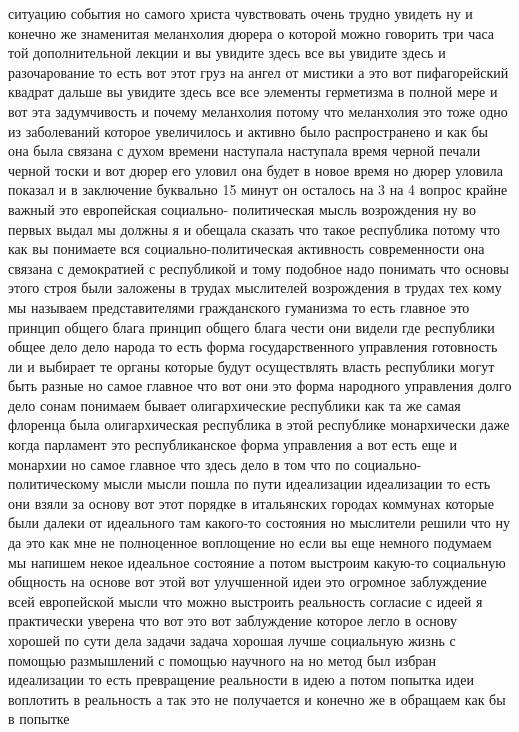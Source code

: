 ситуацию события но самого христа чувствовать очень трудно увидеть ну и конечно
же знаменитая меланхолия дюрера о которой можно говорить три часа той
дополнительной лекции и вы увидите здесь все вы увидите здесь и разочарование то
есть вот этот груз на ангел от мистики а это вот пифагорейский квадрат дальше вы
увидите здесь все все элементы герметизма в полной мере и вот эта задумчивость и
почему меланхолия потому что меланхолия это тоже одно из заболеваний которое
увеличилось и активно было распространено и как бы она была связана с духом
времени наступала наступала время черной печали черной тоски и вот дюрер его
уловил она будет в новое время но дюрер уловила показал и в заключение буквально
15 минут он осталось на 3 на 4 вопрос крайне важный это европейская социально-
политическая мысль возрождения ну во первых выдал мы должны я и обещала сказать
что такое республика потому что как вы понимаете вся социально-политическая
активность современности она связана с демократией с республикой и тому подобное
надо понимать что основы этого строя были заложены в трудах мыслителей
возрождения в трудах тех кому мы называем представителями гражданского гуманизма
то есть главное это принцип общего блага принцип общего блага чести они видели
где республики общее дело дело народа то есть форма государственного управления
готовность ли и выбирает те органы которые будут осуществлять власть республики
могут быть разные но самое главное что вот они это форма народного управления
долго дело сонам понимаем бывает олигархические республики как та же самая
флоренца была олигархическая республика в этой республике монархически даже
когда парламент это республиканское форма управления а вот есть еще и монархии
но самое главное что здесь дело в том что по социально-политическому мысли мысли
пошла по пути идеализации идеализации то есть они взяли за основу вот этот
порядке в итальянских городах коммунах которые были далеки от идеального там
какого-то состояния но мыслители решили что ну да это как мне не полноценное
воплощение но если вы еще немного подумаем мы напишем некое идеальное состояние
а потом выстроим какую-то социальную общность на основе вот этой вот улучшенной
идеи это огромное заблуждение всей европейской мысли что можно выстроить
реальность согласие с идеей я практически уверена что вот это вот заблуждение
которое легло в основу хорошей по сути дела задачи задача хорошая лучше
социальную жизнь с помощью размышлений с помощью научного на но метод был избран
идеализации то есть превращение реальности в идею а потом попытка идеи воплотить
в реальность а так это не получается и конечно же в обращаем как бы в попытке
